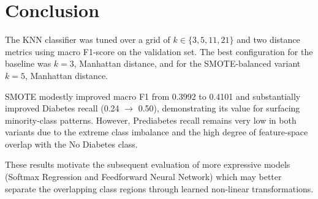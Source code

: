 \documentclass[12pt,a4paper]{article}
\begin{document}
\section{Conclusion}

The KNN classifier was tuned over a grid of $k \in \{3, 5, 11, 21\}$ and two
distance metrics using macro F1-score on the validation set.  The best
configuration for the baseline was $k=3$, Manhattan distance, and for the
SMOTE-balanced variant $k=5$, Manhattan distance.

SMOTE modestly improved macro F1 from 0.3992 to 0.4101 and substantially improved
Diabetes recall (0.24 $\to$ 0.50), demonstrating its value for surfacing
minority-class patterns.  However, Prediabetes recall remains very low in both
variants due to the extreme class imbalance and the high degree of feature-space
overlap with the No Diabetes class.

These results motivate the subsequent evaluation of more expressive models
(Softmax Regression and Feedforward Neural Network) which may better separate the
overlapping class regions through learned non-linear transformations.
\end{document}
